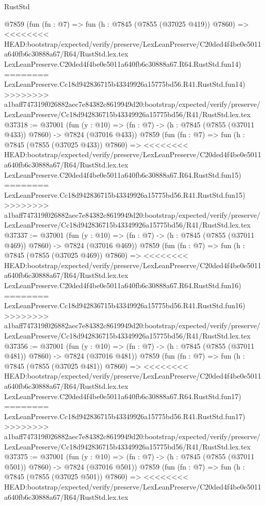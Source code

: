 \begin{lexlean}{RustStd}
\begin{coremodule}
{\begin{coremodule}
{{{{{{{{{{{{{{{{{{{{{{{{{{{{{{{{{{{{{{{{{{{{{{{{{{{{{{    @7859
    (fun (fn : @7) =>
    fun (h : @7845 (@7855 (@37025 @419)) @7860) =>
<<<<<<<< HEAD:bootstrap/expected/verify/preserve/LexLeanPreserve/C20ded4f4be0e5011a640fb6c30888a67/R64/RustStd.lex.tex
    LexLeanPreserve.C20ded4f4be0e5011a640fb6c30888a67.R64.RustStd.fun14)
========
    LexLeanPreserve.Cc18d942836715b43349926a15775bd56.R41.RustStd.fun14)
>>>>>>>> a1baff747319f026882aec7e84382c8619949d20:bootstrap/expected/verify/preserve/LexLeanPreserve/Cc18d942836715b43349926a15775bd56/R41/RustStd.lex.tex
@37318 := @37001
    (fun (y : @10) => (fn : @7) -> (h : @7845 (@7855 (@37011 @433)) @7860) -> @7824 (@37016 @433))
    @7859
    (fun (fn : @7) =>
    fun (h : @7845 (@7855 (@37025 @433)) @7860) =>
<<<<<<<< HEAD:bootstrap/expected/verify/preserve/LexLeanPreserve/C20ded4f4be0e5011a640fb6c30888a67/R64/RustStd.lex.tex
    LexLeanPreserve.C20ded4f4be0e5011a640fb6c30888a67.R64.RustStd.fun15)
========
    LexLeanPreserve.Cc18d942836715b43349926a15775bd56.R41.RustStd.fun15)
>>>>>>>> a1baff747319f026882aec7e84382c8619949d20:bootstrap/expected/verify/preserve/LexLeanPreserve/Cc18d942836715b43349926a15775bd56/R41/RustStd.lex.tex
@37337 := @37001
    (fun (y : @10) => (fn : @7) -> (h : @7845 (@7855 (@37011 @469)) @7860) -> @7824 (@37016 @469))
    @7859
    (fun (fn : @7) =>
    fun (h : @7845 (@7855 (@37025 @469)) @7860) =>
<<<<<<<< HEAD:bootstrap/expected/verify/preserve/LexLeanPreserve/C20ded4f4be0e5011a640fb6c30888a67/R64/RustStd.lex.tex
    LexLeanPreserve.C20ded4f4be0e5011a640fb6c30888a67.R64.RustStd.fun16)
========
    LexLeanPreserve.Cc18d942836715b43349926a15775bd56.R41.RustStd.fun16)
>>>>>>>> a1baff747319f026882aec7e84382c8619949d20:bootstrap/expected/verify/preserve/LexLeanPreserve/Cc18d942836715b43349926a15775bd56/R41/RustStd.lex.tex
@37356 := @37001
    (fun (y : @10) => (fn : @7) -> (h : @7845 (@7855 (@37011 @481)) @7860) -> @7824 (@37016 @481))
    @7859
    (fun (fn : @7) =>
    fun (h : @7845 (@7855 (@37025 @481)) @7860) =>
<<<<<<<< HEAD:bootstrap/expected/verify/preserve/LexLeanPreserve/C20ded4f4be0e5011a640fb6c30888a67/R64/RustStd.lex.tex
    LexLeanPreserve.C20ded4f4be0e5011a640fb6c30888a67.R64.RustStd.fun17)
========
    LexLeanPreserve.Cc18d942836715b43349926a15775bd56.R41.RustStd.fun17)
>>>>>>>> a1baff747319f026882aec7e84382c8619949d20:bootstrap/expected/verify/preserve/LexLeanPreserve/Cc18d942836715b43349926a15775bd56/R41/RustStd.lex.tex
@37375 := @37001
    (fun (y : @10) => (fn : @7) -> (h : @7845 (@7855 (@37011 @501)) @7860) -> @7824 (@37016 @501))
    @7859
    (fun (fn : @7) =>
    fun (h : @7845 (@7855 (@37025 @501)) @7860) =>
<<<<<<<< HEAD:bootstrap/expected/verify/preserve/LexLeanPreserve/C20ded4f4be0e5011a640fb6c30888a67/R64/RustStd.lex.tex
}}}}}}}}}}}}}}}}}}}}}}}}}}}}}}}}}}}}}}}}}}}}}}}}}}}}}}
\end{coremodule}}
\end{coremodule}
\end{lexlean}
